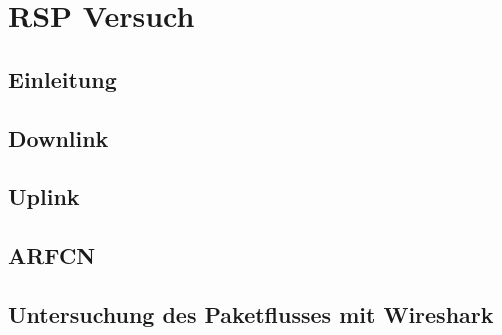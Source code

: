 
\chapter{RSP Versuch}
\section{Einleitung}

\section{Downlink}

\section{Uplink}

\section{ARFCN}


\section{Untersuchung des Paketflusses mit Wireshark}

